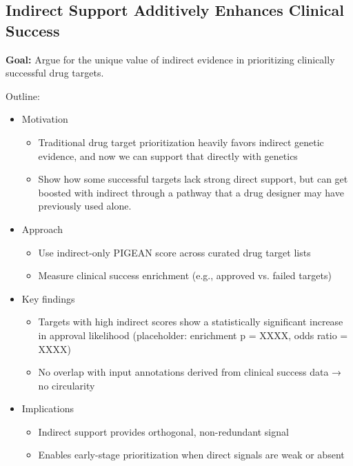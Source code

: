 \documentclass[sn-nature,lineno]{sn-jnl}%
\theoremstyle{thmstyleone}%
\theoremstyle{thmstyletwo}%
\theoremstyle{thmstylethree}%
\begin{document}



\subsection{Indirect Support Additively Enhances Clinical Success}
\textbf{Goal:} Argue for the unique value of indirect evidence in prioritizing clinically successful drug targets.

Outline:
\begin{itemize}
    \item Motivation
    \begin{itemize}
        \item Traditional drug target prioritization heavily favors indirect genetic evidence, and now we can support that directly with genetics
        \item Show how some successful targets lack strong direct support, but can get boosted with indirect through a pathway that a drug designer may have previously used alone.
    \end{itemize}
    \item Approach
    \begin{itemize}
        \item Use indirect-only PIGEAN score across curated drug target lists
        \item Measure clinical success enrichment (e.g., approved vs. failed targets)
    \end{itemize}
    \item Key findings
    \begin{itemize}
        \item Targets with high indirect scores show a statistically significant increase in approval likelihood (placeholder: enrichment p = XXXX, odds ratio = XXXX)
        \item No overlap with input annotations derived from clinical success data → no circularity
    \end{itemize}
    \item Implications
    \begin{itemize}
        \item Indirect support provides orthogonal, non-redundant signal
        \item Enables early-stage prioritization when direct signals are weak or absent
    \end{itemize}
\end{itemize}
\end{document}
